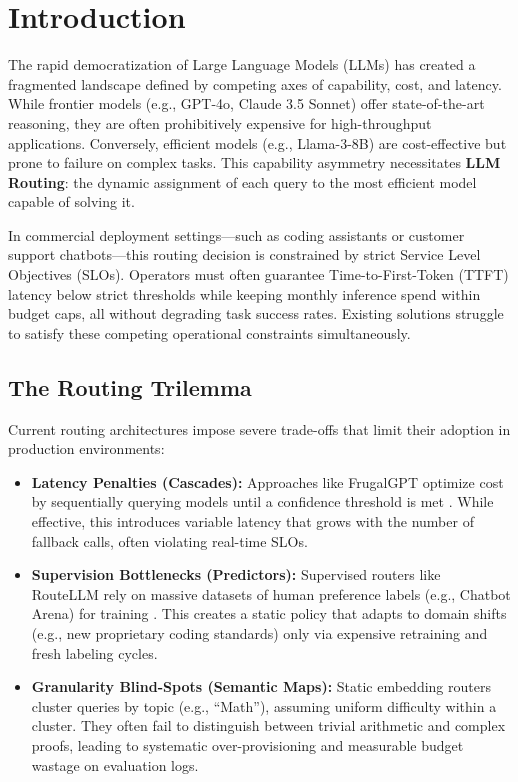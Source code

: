 \section{Introduction}

The rapid democratization of Large Language Models (LLMs) has created a fragmented landscape defined by competing axes of capability, cost, and latency. While frontier models (e.g., GPT-4o, Claude 3.5 Sonnet) offer state-of-the-art reasoning, they are often prohibitively expensive for high-throughput applications. Conversely, efficient models (e.g., Llama-3-8B) are cost-effective but prone to failure on complex tasks. This capability asymmetry necessitates \textbf{LLM Routing}: the dynamic assignment of each query to the most efficient model capable of solving it.

In commercial deployment settings---such as coding assistants or customer support chatbots---this routing decision is constrained by strict Service Level Objectives (SLOs). Operators must often guarantee Time-to-First-Token (TTFT) latency below strict thresholds while keeping monthly inference spend within budget caps, all without degrading task success rates. Existing solutions struggle to satisfy these competing operational constraints simultaneously.

\subsection{The Routing Trilemma}
Current routing architectures impose severe trade-offs that limit their adoption in production environments:

\begin{itemize}
    \item \textbf{Latency Penalties (Cascades):} Approaches like FrugalGPT optimize cost by sequentially querying models until a confidence threshold is met \cite{chen2023frugalgpt}. While effective, this introduces variable latency that grows with the number of fallback calls, often violating real-time SLOs.
    \item \textbf{Supervision Bottlenecks (Predictors):} Supervised routers like RouteLLM rely on massive datasets of human preference labels (e.g., Chatbot Arena) for training \cite{ong2024routellm}. This creates a static policy that adapts to domain shifts (e.g., new proprietary coding standards) only via expensive retraining and fresh labeling cycles.
    \item \textbf{Granularity Blind-Spots (Semantic Maps):} Static embedding routers cluster queries by topic (e.g., ``Math''), assuming uniform difficulty within a cluster. They often fail to distinguish between trivial arithmetic and complex proofs, leading to systematic over-provisioning and measurable budget wastage on evaluation logs.
\end{itemize}

